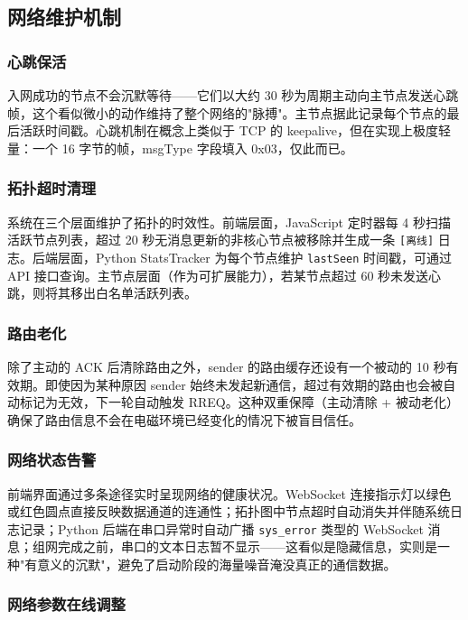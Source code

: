 \documentclass[12pt,a4paper]{ctexart}
\begin{document}
\subsection{网络维护机制}

\subsubsection{心跳保活}

入网成功的节点不会沉默等待——它们以大约 30 秒为周期主动向主节点发送心跳帧，这个看似微小的动作维持了整个网络的"脉搏"。主节点据此记录每个节点的最后活跃时间戳。心跳机制在概念上类似于 TCP 的 keepalive，但在实现上极度轻量：一个 16 字节的帧，msgType 字段填入 0x03，仅此而已。

\subsubsection{拓扑超时清理}

系统在三个层面维护了拓扑的时效性。前端层面，JavaScript 定时器每 4 秒扫描活跃节点列表，超过 20 秒无消息更新的非核心节点被移除并生成一条 \texttt{[离线]} 日志。后端层面，Python StatsTracker 为每个节点维护 \texttt{lastSeen} 时间戳，可通过 API 接口查询。主节点层面（作为可扩展能力），若某节点超过 60 秒未发送心跳，则将其移出白名单活跃列表。

\subsubsection{路由老化}

除了主动的 ACK 后清除路由之外，sender 的路由缓存还设有一个被动的 10 秒有效期。即使因为某种原因 sender 始终未发起新通信，超过有效期的路由也会被自动标记为无效，下一轮自动触发 RREQ。这种双重保障（主动清除 + 被动老化）确保了路由信息不会在电磁环境已经变化的情况下被盲目信任。

\subsubsection{网络状态告警}

前端界面通过多条途径实时呈现网络的健康状况。WebSocket 连接指示灯以绿色或红色圆点直接反映数据通道的连通性；拓扑图中节点超时自动消失并伴随系统日志记录；Python 后端在串口异常时自动广播 \texttt{sys\_error} 类型的 WebSocket 消息；组网完成之前，串口的文本日志暂不显示——这看似是隐藏信息，实则是一种"有意义的沉默"，避免了启动阶段的海量噪音淹没真正的通信数据。

\subsubsection{网络参数在线调整}
\end{document}
